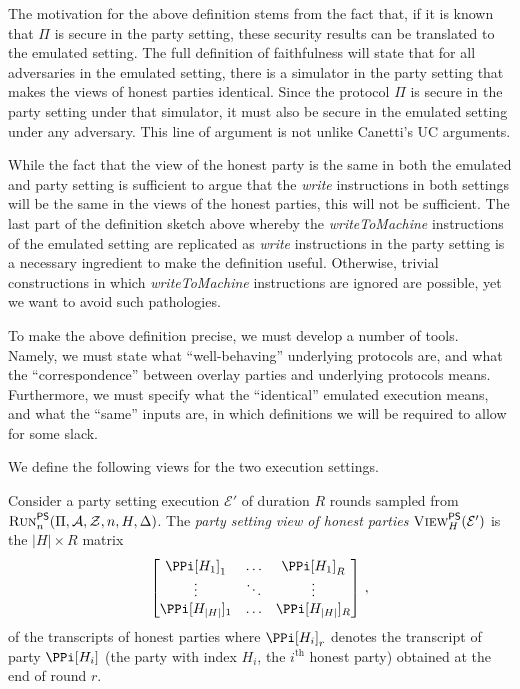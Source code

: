 The motivation for the above definition stems from the fact that, if it is known that
$\Pi$ is secure in the party setting, these security results can be translated to the
emulated setting. The full definition of faithfulness will state that for all adversaries
in the emulated setting, there is a simulator in the party setting that makes the
views of honest parties identical. Since the protocol $\Pi$ is secure in the party setting
under that simulator, it must also be secure in the emulated setting under any adversary.
This line of argument is not unlike Canetti's UC arguments.

While the fact that the view of the honest party is the same in both the emulated and
party setting is sufficient to argue that the \emph{write} instructions in both settings will
be the same in the views of the honest parties, this will not be sufficient.
The last part of the definition sketch above whereby the \emph{writeToMachine} instructions
of the emulated setting are replicated as \emph{write} instructions in the party setting
is a necessary ingredient to make the definition useful. Otherwise, trivial constructions
in which \emph{writeToMachine} instructions are ignored are possible, yet we want to avoid
such pathologies.

To make the above definition precise, we must develop a number of tools. Namely,
we must state what ``well-behaving'' underlying protocols are, and what the ``correspondence''
between overlay parties and underlying protocols means. Furthermore, we must specify
what the ``identical'' emulated execution means, and what the ``same'' inputs are,
in which definitions we will be required to allow for some slack.

We define the following views for the two execution settings.

\begin{definition}
  Consider a party setting execution $\mathcal{E}'$ of duration $R$ rounds
  sampled from
  $\textsc{Run}^{\textsf{PS}}_n(\Pi,\allowbreak \mathcal{A},\allowbreak \mathcal{Z},\allowbreak n,\allowbreak H,\allowbreak \Delta)$.
  The \emph{party setting view of honest parties} $\textsc{View}^{\textsf{PS}}_H(\mathcal{E}')$
  is the $|H|\times R$ matrix
  \[
  \begin{bmatrix}
    \PPi[H_1]_1 &\ldots& \PPi[H_1]_R\\
         \vdots &\ddots& \vdots     \\
    \PPi[H_{|H|}]_1 &\ldots& \PPi[H_{|H|}]_R
  \end{bmatrix}\,,
  \]
  of the transcripts of honest parties
  where $\PPi[H_i]_r$ denotes the transcript of party $\PPi[H_i]$
  (the party with index $H_i$, the $i^\text{th}$ honest party)
  obtained at the end of round $r$.
\end{definition}


